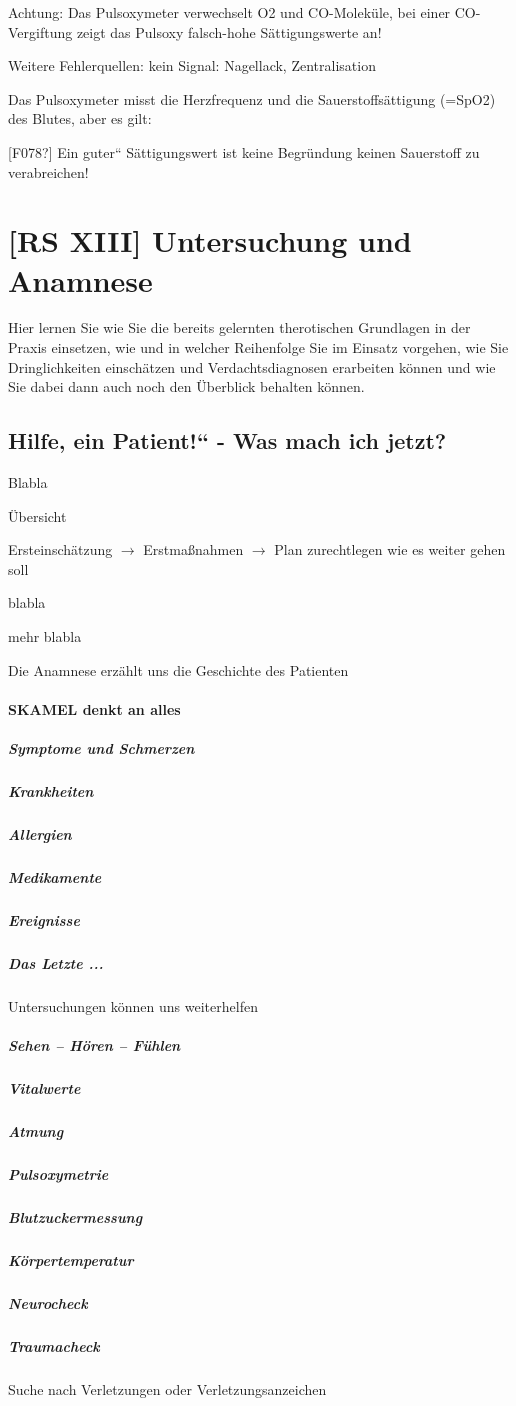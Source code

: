 \documentclass{article}
\begin{document}
Achtung: Das Pulsoxymeter verwechselt O2 und CO-Molek\"ule, bei einer
CO-Vergiftung zeigt das Pulsoxy falsch-hohe S\"attigungswerte an!

Weitere Fehlerquellen: kein Signal: Nagellack, Zentralisation

Das Pulsoxymeter misst die Herzfrequenz und die Sauerstoffs\"attigung
(=SpO2) des Blutes, aber es gilt:

[F078?] Ein {\quotedblbase}guter{\textquotedblleft} S\"attigungswert ist
keine Begr\"undung keinen Sauerstoff zu verabreichen!

\section{[RS XIII] Untersuchung und Anamnese}
Hier lernen Sie wie Sie die bereits gelernten therotischen Grundlagen in
der Praxis einsetzen, wie und in welcher Reihenfolge Sie im Einsatz
vorgehen, wie Sie Dringlichkeiten einsch\"atzen und Verdachtsdiagnosen
erarbeiten k\"onnen und wie Sie dabei dann auch noch den \"Uberblick
behalten k\"onnen.

\subsection{{\quotedblbase}Hilfe, ein Patient!{\textquotedblleft} - Was
mach{\textquotesingle} ich jetzt?}
Blabla

\"Ubersicht 

Ersteinsch\"atzung ${\rightarrow}$  Erstma{\ss}nahmen ${\rightarrow}$ 
Plan zurechtlegen wie es weiter gehen soll

blabla

mehr blabla

Die Anamnese erz\"ahlt uns die Geschichte des Patienten

\paragraph{S{\textquotesingle}KAMEL denkt an alles}
\subparagraph{Symptome und Schmerzen}
\subparagraph{Krankheiten}
\subparagraph{Allergien}
\subparagraph{Medikamente}
\subparagraph{Ereignisse}
\subparagraph{Das Letzte ...}
Untersuchungen k\"onnen uns weiterhelfen

\subparagraph{Sehen -- H\"oren -- F\"uhlen }
\subparagraph{Vitalwerte}
\subparagraph{Atmung}
\subparagraph{Pulsoxymetrie}
\subparagraph{Blutzuckermessung}
\subparagraph{K\"orpertemperatur}
\subparagraph{Neurocheck}
\subparagraph{Traumacheck}
Suche nach Verletzungen oder Verletzungsanzeichen
\end{document}
